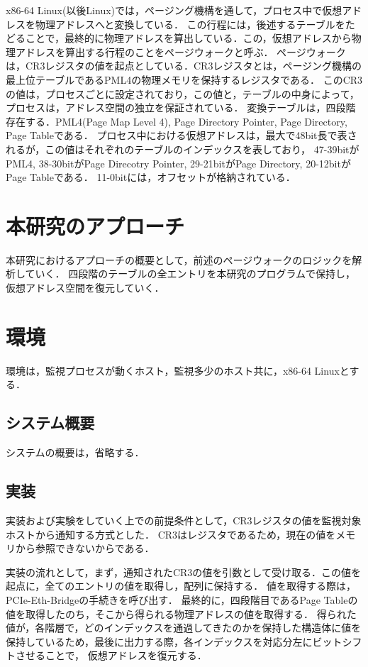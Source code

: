 \documentclass[a4j,10pt]{jsarticle}
\begin{document}
    x86-64 Linux(以後Linux)では，ページング機構を通して，プロセス中で仮想アドレスを物理アドレスへと変換している．
    この行程には，後述するテーブルをたどることで，最終的に物理アドレスを算出している．この，仮想アドレスから物理アドレスを算出する行程のことをページウォークと呼ぶ．
    ページウォークは，CR3レジスタの値を起点としている．CR3レジスタとは，ページング機構の最上位テーブルであるPML4の物理メモリを保持するレジスタである．
    このCR3の値は，プロセスごとに設定されており，この値と，テーブルの中身によって，プロセスは，アドレス空間の独立を保証されている．
    変換テーブルは，四段階存在する．PML4(Page Map Level 4), Page Directory Pointer, Page Directory, Page Tableである．
    プロセス中における仮想アドレスは，最大で48bit長で表されるが，この値はそれぞれのテーブルのインデックスを表しており，
    47-39bitがPML4, 38-30bitがPage Direcotry Pointer, 29-21bitがPage Directory, 20-12bitがPage Tableである．
    11-0bitには，オフセットが格納されている．

    \section{本研究のアプローチ}

    本研究におけるアプローチの概要として，前述のページウォークのロジックを解析していく．
    四段階のテーブルの全エントリを本研究のプログラムで保持し，仮想アドレス空間を復元していく．

    \section{環境}

    環境は，監視プロセスが動くホスト，監視多少のホスト共に，x86-64 Linuxとする．

    \subsection{システム概要}

    システムの概要は，省略する．

    \subsection{実装}

    実装および実験をしていく上での前提条件として，CR3レジスタの値を監視対象ホストから通知する方式とした．
    CR3はレジスタであるため，現在の値をメモリから参照できないからである．

    実装の流れとして，まず，通知されたCR3の値を引数として受け取る．この値を起点に，全てのエントリの値を取得し，配列に保持する．
    値を取得する際は，PCIe-Eth-Bridgeの手続きを呼び出す．
    最終的に，四段階目であるPage Tableの値を取得したのち，そこから得られる物理アドレスの値を取得する．
    得られた値が，各階層で，どのインデックスを通過してきたのかを保持した構造体に値を保持しているため，最後に出力する際，各インデックスを対応分左にビットシフトさせることで，
    仮想アドレスを復元する．
\end{document}
